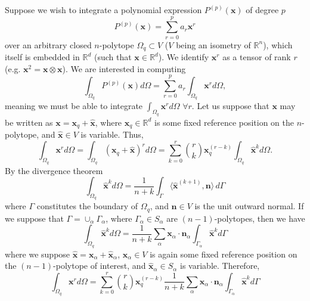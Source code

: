 \documentclass[11pt]{article} %
\begin{document}
Suppose we wish to integrate a polynomial expression $P^{(p)}(\mathbf{x})$ of degree $p$
\begin{equation}
	P^{(p)}(\mathbf{x}) = \sum_{r=0}^{p} a_r \mathbf{x}^r
\end{equation}
over an arbitrary closed $n$-polytope $\Omega_q \subset V$ ($V$ being an isometry of $\mathbb{R}^n$), which itself is embedded in $\mathbb{R}^d$ (such that $\mathbf{x} \in \mathbb{R}^d$). We identify $\mathbf{x}^r$ as a tensor of rank $r$ (e.g. $\mathbf{x}^2 = \mathbf{x} \otimes \mathbf{x}$). We are interested in computing
\begin{equation}
	\int_{\Omega_q} P^{(p)}(\mathbf{x}) d \Omega = \sum_{r=0}^{p} a_r \int_{\Omega_q} \mathbf{x}^r d \Omega,
\end{equation}
meaning we must be able to integrate $\int_{\Omega_q} \mathbf{x}^r d \Omega \, \, \forall r$. Let us suppose that $\mathbf{x}$ may be written as $\mathbf{x} = \mathbf{x}_q + \hat{\mathbf{x}}$, where $\mathbf{x}_q \in \mathbb{R}^d$ is some fixed reference position on the $n$-polytope, and $\hat{\mathbf{x}} \in V$ is variable. Thus,
\begin{equation}
	\int_{\Omega_q} \mathbf{x}^r d \Omega = \int_{\Omega_q} (\mathbf{x}_q + \hat{\mathbf{x}})^r d \Omega = \sum_{k = 0}^r \binom{r}{k} \mathbf{x}_q^{(r-k)} \int_{\Omega_q} \hat{\mathbf{x}}^k d \Omega.
\end{equation}
By the divergence theorem
\begin{equation}
	\int_{\Omega_q} \hat{\mathbf{x}}^k d \Omega = \frac{1}{n+k} \int_{\Gamma} \langle \hat{\mathbf{x}}^{(k+1)} , \mathbf{n} \rangle \, d \Gamma
\end{equation}
where $\Gamma$ constitutes the boundary of $\Omega_q$, and $\mathbf{n} \in V$ is the unit outward normal. If we suppose that $\Gamma = \cup_{\alpha} \Gamma_{\alpha}$, where $\Gamma_{\alpha} \in S_{\alpha}$ are $(n-1)$-polytopes, then we have
\begin{equation}
	\int_{\Omega_q} \hat{\mathbf{x}}^k d \Omega = \frac{1}{n+k} \sum_{\alpha} \mathbf{x}_{\alpha} \cdot \mathbf{n}_{\alpha} \int_{\Gamma_{\alpha}} \hat{\mathbf{x}}^k   d \Gamma
\end{equation}
where we suppose $\hat{\mathbf{x}} = \mathbf{x}_{\alpha} + \hat{\mathbf{x}}_{\alpha}$, $\mathbf{x}_{\alpha} \in V$ is again some fixed reference position on the $(n-1)$-polytope of interest, and $\hat{\mathbf{x}}_{\alpha} \in S_{\alpha}$ is variable. Therefore,
\begin{equation}
	\int_{\Omega_q} \mathbf{x}^r d \Omega = \sum_{k = 0}^r \binom{r}{k} \mathbf{x}_q^{(r-k)} \frac{1}{n+k} \sum_{\alpha} \mathbf{x}_{\alpha} \cdot \mathbf{n}_{\alpha} \int_{\Gamma_{\alpha}} \hat{\mathbf{x}}^k   d \Gamma
\end{equation}
\end{document}
